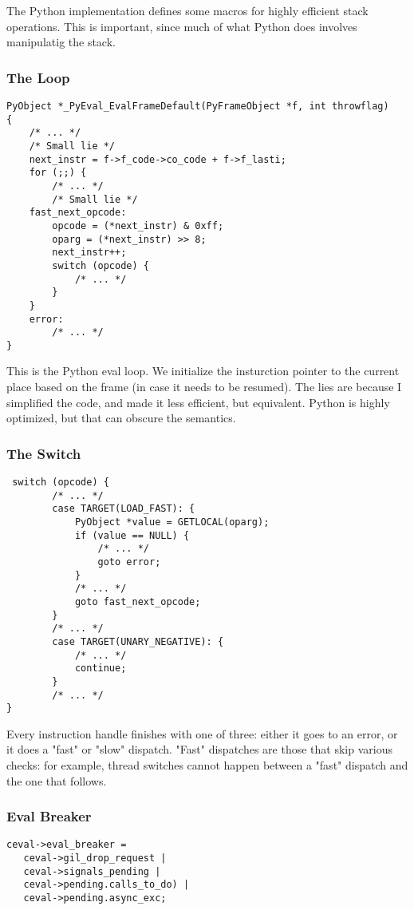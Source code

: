 The Python implementation defines some macros for highly
efficient stack operations. This is important,
since much of what Python does involves manipulatig the
stack.

\begin{frame}[fragile]
\frametitle{The Loop}

\begin{lstlisting}
PyObject *_PyEval_EvalFrameDefault(PyFrameObject *f, int throwflag)
{
    /* ... */
    /* Small lie */
    next_instr = f->f_code->co_code + f->f_lasti;
    for (;;) {
        /* ... */
        /* Small lie */
    fast_next_opcode:
        opcode = (*next_instr) & 0xff;
        oparg = (*next_instr) >> 8;
        next_instr++;
        switch (opcode) {
            /* ... */
        }
    }
    error:
        /* ... */
}
\end{lstlisting}
\end{frame}

This is the Python eval loop.
We initialize the insturction pointer to the current place based
on the frame
(in case it needs to be resumed).
The lies are because I simplified the code, and made it less efficient,
but equivalent. Python is highly optimized, but that can obscure
the semantics.


\begin{frame}
\frametitle{The Switch}
\begin{lstlisting}
 switch (opcode) {
        /* ... */
        case TARGET(LOAD_FAST): {
            PyObject *value = GETLOCAL(oparg);
            if (value == NULL) {
                /* ... */
                goto error;
            }
            /* ... */
            goto fast_next_opcode;
        }
        /* ... */
        case TARGET(UNARY_NEGATIVE): {
            /* ... */
            continue;
        }
        /* ... */
}
\end{lstlisting}
\end{frame}

Every instruction handle finishes with one of three:
either it goes to an error, or it does a
"fast"
or
"slow"
dispatch.
"Fast" dispatches are those that skip various checks:
for example,
thread switches cannot happen between a "fast" dispatch
and the one that follows.

\begin{frame}
\frametitle{Eval Breaker}
\begin{lstlisting}
ceval->eval_breaker = 
   ceval->gil_drop_request |
   ceval->signals_pending | 
   ceval->pending.calls_to_do) | 
   ceval->pending.async_exc;
\end{lstlisting}
\end{frame}

